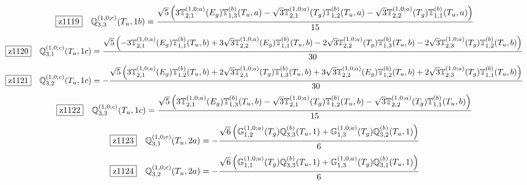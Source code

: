 \documentclass[fleqn,10pt,landscape]{jsarticle}
\begin{document}
\begin{dmath*}
\hspace*{3mm}\fbox{z1119}\quad \mathbb{Q}_{3,3}^{(1,0;c)}(T_{u},1b)=\frac{\sqrt{5} \left(3 \mathbb{T}_{2,1}^{(1,0;a)}(E_{g}) \mathbb{T}_{1,3}^{(b)}(T_{u},a) - \sqrt{3} \mathbb{T}_{2,1}^{(1,0;a)}(T_{g}) \mathbb{T}_{1,2}^{(b)}(T_{u},a) - \sqrt{3} \mathbb{T}_{2,2}^{(1,0;a)}(T_{g}) \mathbb{T}_{1,1}^{(b)}(T_{u},a)\right)}{15}
\end{dmath*}
\begin{dmath*}
\hspace*{3mm}\fbox{z1120}\quad \mathbb{Q}_{3,1}^{(1,0;c)}(T_{u},1c)=\frac{\sqrt{5} \left(- 3 \mathbb{T}_{2,1}^{(1,0;a)}(E_{g}) \mathbb{T}_{1,1}^{(b)}(T_{u},b) + 3 \sqrt{3} \mathbb{T}_{2,2}^{(1,0;a)}(E_{g}) \mathbb{T}_{1,1}^{(b)}(T_{u},b) - 2 \sqrt{3} \mathbb{T}_{2,2}^{(1,0;a)}(T_{g}) \mathbb{T}_{1,3}^{(b)}(T_{u},b) - 2 \sqrt{3} \mathbb{T}_{2,3}^{(1,0;a)}(T_{g}) \mathbb{T}_{1,2}^{(b)}(T_{u},b)\right)}{30}
\end{dmath*}
\begin{dmath*}
\hspace*{3mm}\fbox{z1121}\quad \mathbb{Q}_{3,2}^{(1,0;c)}(T_{u},1c)=- \frac{\sqrt{5} \left(3 \mathbb{T}_{2,1}^{(1,0;a)}(E_{g}) \mathbb{T}_{1,2}^{(b)}(T_{u},b) + 2 \sqrt{3} \mathbb{T}_{2,1}^{(1,0;a)}(T_{g}) \mathbb{T}_{1,3}^{(b)}(T_{u},b) + 3 \sqrt{3} \mathbb{T}_{2,2}^{(1,0;a)}(E_{g}) \mathbb{T}_{1,2}^{(b)}(T_{u},b) + 2 \sqrt{3} \mathbb{T}_{2,3}^{(1,0;a)}(T_{g}) \mathbb{T}_{1,1}^{(b)}(T_{u},b)\right)}{30}
\end{dmath*}
\begin{dmath*}
\hspace*{3mm}\fbox{z1122}\quad \mathbb{Q}_{3,3}^{(1,0;c)}(T_{u},1c)=\frac{\sqrt{5} \left(3 \mathbb{T}_{2,1}^{(1,0;a)}(E_{g}) \mathbb{T}_{1,3}^{(b)}(T_{u},b) - \sqrt{3} \mathbb{T}_{2,1}^{(1,0;a)}(T_{g}) \mathbb{T}_{1,2}^{(b)}(T_{u},b) - \sqrt{3} \mathbb{T}_{2,2}^{(1,0;a)}(T_{g}) \mathbb{T}_{1,1}^{(b)}(T_{u},b)\right)}{15}
\end{dmath*}
\begin{dmath*}
\hspace*{3mm}\fbox{z1123}\quad \mathbb{Q}_{3,1}^{(1,0;c)}(T_{u},2a)=- \frac{\sqrt{6} \left(\mathbb{G}_{1,2}^{(1,0;a)}(T_{g}) \mathbb{Q}_{3,3}^{(b)}(T_{u},1) + \mathbb{G}_{1,3}^{(1,0;a)}(T_{g}) \mathbb{Q}_{3,2}^{(b)}(T_{u},1)\right)}{6}
\end{dmath*}
\begin{dmath*}
\hspace*{3mm}\fbox{z1124}\quad \mathbb{Q}_{3,2}^{(1,0;c)}(T_{u},2a)=- \frac{\sqrt{6} \left(\mathbb{G}_{1,1}^{(1,0;a)}(T_{g}) \mathbb{Q}_{3,3}^{(b)}(T_{u},1) + \mathbb{G}_{1,3}^{(1,0;a)}(T_{g}) \mathbb{Q}_{3,1}^{(b)}(T_{u},1)\right)}{6}
\end{dmath*}
\end{document}
